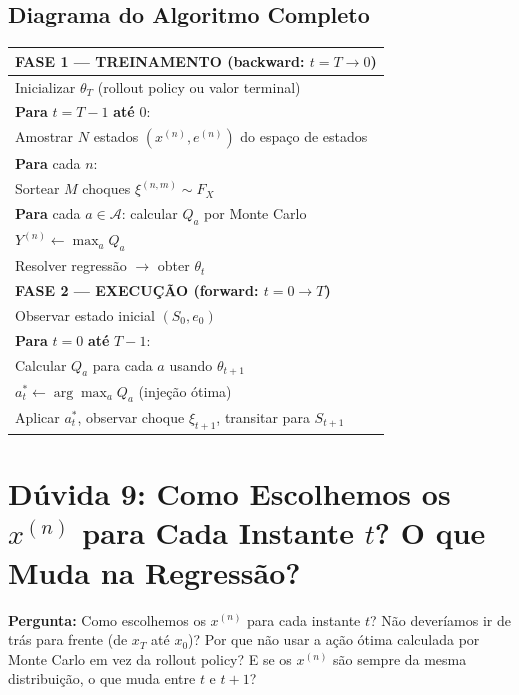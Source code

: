 \documentclass[12pt,a4paper]{article}
\begin{document}
\subsection{Diagrama do Algoritmo Completo}

\begin{center}
\begin{tabular}{|l|}
\hline
\textbf{FASE 1 --- TREINAMENTO (backward: $t = T \to 0$)} \\
\hline
Inicializar $\theta_T$ (rollout policy ou valor terminal) \\
\textbf{Para} $t = T-1$ \textbf{até} $0$: \\
\quad Amostrar $N$ estados $(x^{(n)}, e^{(n)})$ do espaço de estados \\
\quad \textbf{Para} cada $n$: \\
\quad \quad Sortear $M$ choques $\xi^{(n,m)} \sim F_X$ \\
\quad \quad \textbf{Para} cada $a \in \mathcal{A}$: calcular $Q_a$ por Monte Carlo \\
\quad \quad $Y^{(n)} \leftarrow \max_a Q_a$ \\
\quad Resolver regressão $\to$ obter $\theta_t$ \\
\hline
\textbf{FASE 2 --- EXECUÇÃO (forward: $t = 0 \to T$)} \\
\hline
Observar estado inicial $(S_0, e_0)$ \\
\textbf{Para} $t = 0$ \textbf{até} $T-1$: \\
\quad Calcular $Q_a$ para cada $a$ usando $\theta_{t+1}$ \\
\quad $a_t^* \leftarrow \arg\max_a Q_a$ \quad (injeção ótima) \\
\quad Aplicar $a_t^*$, observar choque $\xi_{t+1}$, transitar para $S_{t+1}$ \\
\hline
\end{tabular}
\end{center}

\section{Dúvida 9: Como Escolhemos os \texorpdfstring{$x^{(n)}$}{x(n)} para Cada Instante \texorpdfstring{$t$}{t}? O que Muda na Regressão?}

\textbf{Pergunta:} Como escolhemos os $x^{(n)}$ para cada instante $t$? Não deveríamos ir de trás para frente (de $x_T$ até $x_0$)? Por que não usar a ação ótima calculada por Monte Carlo em vez da rollout policy? E se os $x^{(n)}$ são sempre da mesma distribuição, o que muda entre $t$ e $t+1$?
\end{document}
